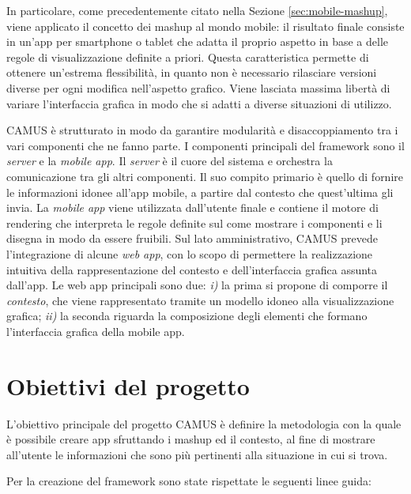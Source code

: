 In particolare, come precedentemente citato nella Sezione \ref{sec:mobile-mashup}, viene applicato il concetto dei mashup al mondo mobile: il risultato finale consiste in un'app per smartphone o tablet che adatta il proprio aspetto in base a delle regole di visualizzazione definite a priori. Questa caratteristica permette di ottenere un'estrema flessibilità, in quanto non è necessario rilasciare versioni diverse per ogni modifica nell'aspetto grafico. Viene lasciata massima libertà di variare l'interfaccia grafica in modo che si adatti a diverse situazioni di utilizzo.

CAMUS è strutturato in modo da garantire modularità e disaccoppiamento tra i vari componenti che ne fanno parte. I componenti principali del framework sono il \emph{server} e la \emph{mobile app}. Il \emph{server} è il cuore del sistema e orchestra la comunicazione tra gli altri componenti. Il suo compito primario è quello di fornire le informazioni idonee all'app mobile, a partire dal contesto che quest'ultima gli invia. La \emph{mobile app} viene utilizzata dall'utente finale e contiene il motore di rendering che interpreta le regole definite sul come mostrare i componenti e li disegna in modo da essere fruibili.
Sul lato amministrativo, CAMUS prevede l'integrazione di alcune \emph{web app}, con lo scopo di permettere la realizzazione intuitiva della rappresentazione del contesto e dell'interfaccia grafica assunta dall'app. Le web app principali sono due: \emph{i)} la prima si propone di comporre il \emph{contesto}, che viene rappresentato tramite un modello idoneo alla visualizzazione grafica; \emph{ii)} la seconda riguarda la composizione degli elementi che formano l'interfaccia grafica della mobile app.

\section{Obiettivi del progetto\label{sec:obiettivi-progetto}}

L'obiettivo principale del progetto CAMUS è definire la metodologia con la quale è possibile creare app sfruttando i mashup ed il contesto, al fine di mostrare all'utente le informazioni che sono più pertinenti alla situazione in cui si trova.

Per la creazione del framework sono state rispettate le seguenti linee guida:

